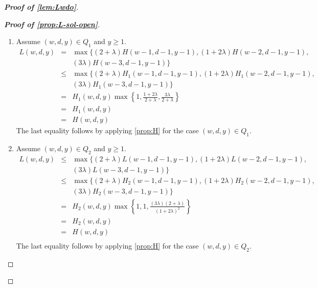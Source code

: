 \documentclass[10pt,a4paper]{article}
\newcommand{\openinteger}{y}
\begin{document}
\begin{proof}[\textbf{Proof of \cref{lem:Lwdo}}]
\begin{proof}[\textbf{Proof of \cref{prop:L-sol-open}}]
\begin{enumerate}[label=\textbf{Case \arabic*:}, itemindent=*, leftmargin=0em]
\item Assume $(w, d, \openinteger)\in Q_1$ and $\openinteger \ge 1$.
\begin{eqnarray*}
L(w, d, \openinteger) & = & \max\{(2+\lambda)H(w-1, d-1, \openinteger-1), (1+2\lambda)H(w-2, d-1, \openinteger-1), \\
& & (3\lambda)H(w-3, d-1, \openinteger-1)\}\\
& \le & \max\{(2+\lambda)H_1(w-1, d-1, \openinteger-1), (1+2\lambda)H_1(w-2, d-1, \openinteger-1), \\
& & (3\lambda)H_1(w-3, d-1, \openinteger-1)\}\\
& = & H_1(w, d, \openinteger)\max\left\{1, \frac{1+2\lambda}{2+\lambda}, \frac{3\lambda}{2+\lambda}\right\} \\
& = & H_1(w, d, \openinteger)\\
& = & H(w, d, \openinteger)
\end{eqnarray*}
The last equality follows by applying \cref{prop:H} for the case $(w, d,\openinteger)\in Q_1$.

\item Assume $(w, d, \openinteger)\in Q_2$ and $\openinteger \ge 1$.
\begin{eqnarray*}
L(w, d, \openinteger) & \leq & \max\{(2+\lambda)L(w-1, d-1, \openinteger-1), (1+2\lambda)L(w-2, d-1, \openinteger-1), \\
& & (3\lambda)L(w-3, d-1, \openinteger-1)\}\\
& \le & \max\{(2+\lambda)H_2(w-1, d-1, \openinteger-1), (1+2\lambda)H_2(w-2, d-1, \openinteger-1), \\
& & (3\lambda)H_2(w-3, d-1, \openinteger-1)\}\\
& = & H_2(w, d, \openinteger)\max\left\{1, 1, \frac{(3\lambda)(2+\lambda)}{(1+2\lambda)^2} \right\}\\
& = & H_2(w, d, \openinteger)\\
& = & H(w, d, \openinteger)\\
\end{eqnarray*}
The last equality follows by applying \cref{prop:H} for the case $(w, d,\openinteger)\in Q_2$.


\end{enumerate}
\end{proof}
\end{proof}
\end{document}
